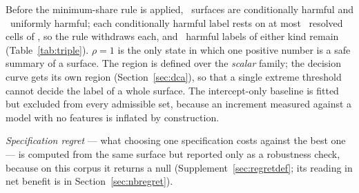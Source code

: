 Before the minimum-share rule is applied, \nCondHarmful\ surfaces
are conditionally harmful and \nUniformlyHarmful\ uniformly harmful; each
conditionally harmful label rests on at most \nCondHarmfulResolvedMax\
resolved cells of \nHelpdeskFamily, so the rule withdraws each, and
\nCondHarmfulMinShare\ harmful labels of either kind remain
(Table~\ref{tab:triple}). $\rho = 1$ is the only state in which one positive
number is a safe summary of a surface. The region is defined over the
\emph{scalar} family; the decision curve gets its own region
(Section~\ref{sec:dca}), so that a single extreme threshold cannot decide the
label of a whole surface. The intercept-only baseline is fitted but excluded
from every admissible set, because an increment measured against a model with
no features is inflated by construction.

\emph{Specification regret} --- what choosing one specification
costs against the best one --- is computed from the same surface but reported
only as a robustness check, because on this corpus it returns a null
(Supplement~\ref{sec:regretdef}; its reading in net benefit is in
Section~\ref{sec:nbregret}).

